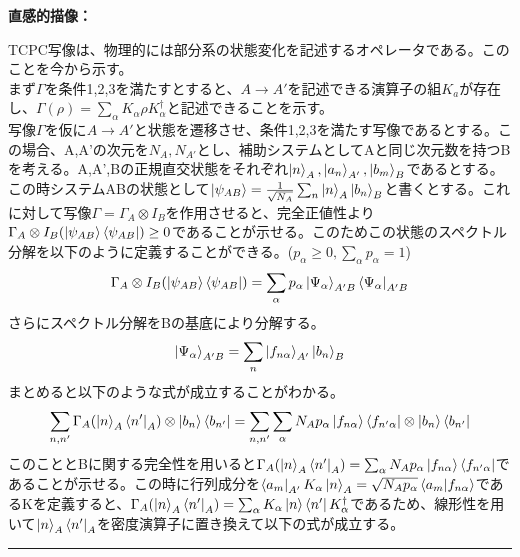 \documentclass[a4paper,10.5pt]{article}
\numberwithin{equation}{section}
\newenvironment{intuitionbox}
{\begin{prooflabel}\textbf{直感的描像：}\end{prooflabel}\vspace{0.8em}}
{\par\vspace{1em}\hrule\vspace{1em}}
\begin{document}
\begin{intuitionbox}
TCPC写像は、物理的には部分系の状態変化を記述するオペレータである。このことを今から示す。\\
まず$\Gamma$を条件1,2,3を満たすとすると、$A\to A'$を記述できる演算子の組{$K_{a}$}が存在し、$\Gamma(\rho)=\sum_{\alpha}K_{\alpha}\rho K_{\alpha}^{\dagger}$と記述できることを示す。\\
写像$\Gamma$を仮に$A\to A'$と状態を遷移させ、条件1,2,3を満たす写像であるとする。この場合、A,A'の次元を$N_{A},N_{A'}$とし、補助システムとしてAと同じ次元数を持つBを考える。A,A',Bの正規直交状態をそれぞれ$\ket{n}_{A},\ket{a_{n}}_{A'},\ket{b_{m}}_{B}$であるとする。この時システムABの状態として$\ket{\psi_{AB}}=\frac{1}{\sqrt{N_{A}}}\sum_{n}\ket{n}_{A}\ket{b_{n}}_{B}$と書くとする。これに対して写像$\Gamma=\Gamma_{A}\otimes I_{B}$を作用させると、完全正値性より$\Gamma_{A}\otimes I_{B}(\ket{\psi_{AB}}\bra{\psi_{AB}})\geq 0$であることが示せる。このためこの状態のスペクトル分解を以下のように定義することができる。($p_{\alpha}\geq 0,\sum_{\alpha} p_{\alpha}=1$)
\begin{equation}\begin{split}
    \Gamma_{A}\otimes I_{B}(\ket{\psi_{AB}}\bra{\psi_{AB}})
    = \sum_{\alpha} p_{\alpha}\ket{\Psi_{\alpha}}_{A'B}\bra{\Psi_{\alpha}}_{A'B}
\end{split} \end{equation}
さらにスペクトル分解をBの基底により分解する。
\begin{equation}\begin{split}
    \ket{\Psi_{\alpha}}_{A'B} = \sum_{n}\ket{f_{n\alpha}}_{A'}\ket{b_{n}}_{B}
\end{split} \end{equation}
まとめると以下のような式が成立することがわかる。
\begin{equation}\begin{split}
    \sum_{n,n'}\Gamma_{A}(\ket{n}_{A}\bra{n'}_{A} )\otimes \ket{b_{n}}\bra{b_{n'}}
    = \sum_{n,n'}\sum_{\alpha}N_{A}p_{\alpha} \ket{f_{n\alpha}}\bra{f_{n'\alpha}}
    \otimes \ket{b_{n}}\bra{b_{n'}}
\end{split} \end{equation}
このこととBに関する完全性を用いると$\Gamma_{A}(\ket{n}_{A}\bra{n'}_{A} )=\sum_{\alpha}N_{A}p_{\alpha} \ket{f_{n\alpha}}\bra{f_{n'\alpha}}$であることが示せる。この時に行列成分を$\bra{a_{m}}_{A'}K_{\alpha}\ket{n}_{A}= \sqrt{N_{A}p_{\alpha}}\bra{a_{m}}\ket{f_{n\alpha}}$であるKを定義すると、$\Gamma_{A}(\ket{n}_{A}\bra{n'}_{A} )=\sum_{\alpha}K_{\alpha}\ket{n}\bra{n'}K^{\dagger}_{\alpha}$であるため、線形性を用いて$\ket{n}_{A}\bra{n'}_{A}$を密度演算子に置き換えて以下の式が成立する。

\end{intuitionbox}
\end{document}
